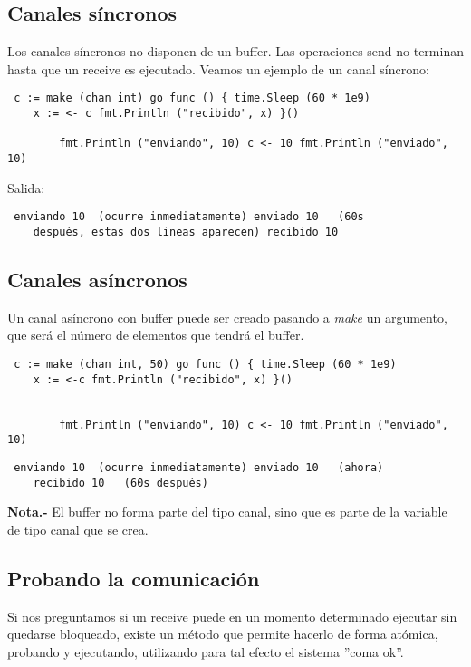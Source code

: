 	\subsection{Canales síncronos}
	
	Los canales síncronos no disponen de un buffer. Las operaciones send no
	terminan hasta que un receive es ejecutado. Veamos un ejemplo de un canal
	síncrono:
	
	\begin{verbatim} c := make (chan int) go func () { time.Sleep (60 * 1e9)
	x := <- c fmt.Println ("recibido", x) }()
	   
		fmt.Println ("enviando", 10) c <- 10 fmt.Println ("enviado", 10)
		\end{verbatim}
	
	Salida:
	
	\begin{verbatim} enviando 10  (ocurre inmediatamente) enviado 10   (60s
	después, estas dos lineas aparecen) recibido 10 \end{verbatim}

	\subsection{Canales asíncronos}
	
	Un canal asíncrono con buffer puede ser creado pasando a \textit{make} un
	argumento, que será el número de elementos que tendrá el buffer.
	
	\begin{verbatim} c := make (chan int, 50) go func () { time.Sleep (60 * 1e9)
	x := <-c fmt.Println ("recibido", x) }()
	   
	   
		fmt.Println ("enviando", 10) c <- 10 fmt.Println ("enviado", 10)
		\end{verbatim}
	
	\begin{verbatim} enviando 10  (ocurre inmediatamente) enviado 10   (ahora)
	recibido 10   (60s después) \end{verbatim}
	
	\textbf{Nota.-} El buffer no forma parte del tipo canal, sino que es parte
	de la variable de tipo canal que se crea.
	
	\subsection{Probando la comunicación}
	
	Si nos preguntamos si un receive puede en un momento determinado ejecutar
	sin quedarse bloqueado, existe un método que permite hacerlo de forma
	atómica, probando y ejecutando, utilizando para tal efecto el sistema ''coma
	ok''.
	
